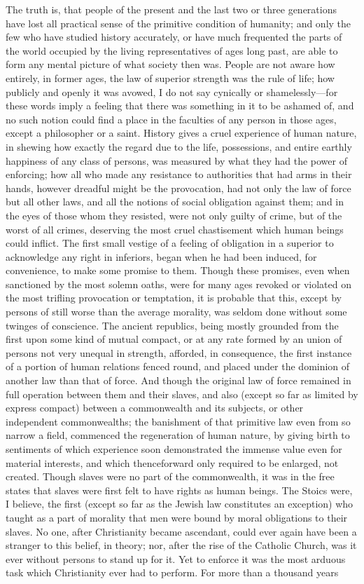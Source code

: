 \documentclass[12pt]{report}
\begin{document}
The truth is, that people of the present and the last two or three generations have lost all practical sense of the primitive condition of humanity; and only the few who have studied history accurately, or have much frequented the parts of the world occupied by the living representatives of ages long past, are able to form any mental picture of what society then was. People are not aware how entirely, in former ages, the law of superior strength was the rule of life; how publicly and openly it was avowed, I do not say cynically or shamelessly—for these words imply a feeling that there was something in it to be ashamed of, and no such notion could find a place in the faculties of any person in those ages, except a philosopher or a saint. History gives a cruel experience of human nature, in shewing how exactly the regard due to the life, possessions, and entire earthly happiness of any class of persons, was measured by what they had the power of enforcing; how all who made any resistance to authorities that had arms in their hands, however dreadful might be the provocation, had not only the law of force but all other laws, and all the notions of social obligation against them; and in the eyes of those whom they resisted, were not only guilty of crime, but of the worst of all crimes, deserving the most cruel chastisement which human beings could inflict. The first small vestige of a feeling of obligation in a superior to acknowledge any right in inferiors, began when he had been induced, for convenience, to make some promise to them. Though these promises, even when sanctioned by the most solemn oaths, were for many ages revoked or violated on the most trifling provocation or temptation, it is probable that this, except by persons of still worse than the average morality, was seldom done without some twinges of conscience. The ancient republics, being mostly grounded from the first upon some kind of mutual compact, or at any rate formed by an union of persons not very unequal in strength, afforded, in consequence, the first instance of a portion of human relations fenced round, and placed under the dominion of another law than that of force. And though the original law of force remained in full operation between them and their slaves, and also (except so far as limited by express compact) between a commonwealth and its subjects, or other independent commonwealths; the banishment of that primitive law even from so narrow a field, commenced the regeneration of human nature, by giving birth to sentiments of which experience soon demonstrated the immense value even for material interests, and which thenceforward only required to be enlarged, not created. Though slaves were no part of the commonwealth, it was in the free states that slaves were first felt to have rights as human beings. The Stoics were, I believe, the first (except so far as the Jewish law constitutes an exception) who taught as a part of morality that men were bound by moral obligations to their slaves. No one, after Christianity became ascendant, could ever again have been a stranger to this belief, in theory; nor, after the rise of the Catholic Church, was it ever without persons to stand up for it. Yet to enforce it was the most arduous task which Christianity ever had to perform. For more than a thousand years 
\end{document}
